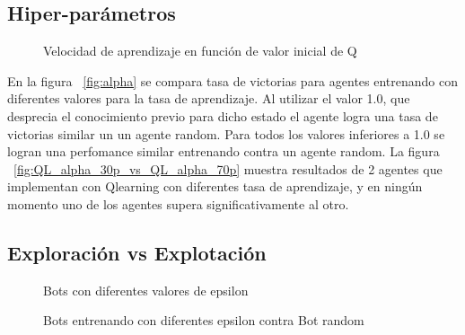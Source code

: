 
\subsection{Hiper-parámetros}

\begin{figure}[H]
\begin{center}
\caption{Velocidad de aprendizaje en función de valor inicial de Q}
\label{fig:qinit}
\end{center}
\end{figure}


En la figura ~\ref{fig:alpha} se compara tasa de victorias para agentes entrenando con diferentes valores para la tasa de aprendizaje. Al utilizar el valor 1.0, que desprecia el conocimiento previo para dicho estado el agente logra una tasa de victorias similar un un agente random. Para todos los valores inferiores a 1.0 se logran una perfomance similar entrenando contra un agente random. La figura ~\ref{fig:QL_alpha_30p_vs_QL_alpha_70p} muestra resultados de 2 agentes que implementan con Qlearning con diferentes tasa de aprendizaje, y en ningún momento uno de los agentes supera significativamente al otro. 
 
\begin{figure}[H]
\begin{center}
\caption{}
\label{fig:alphag}
\end{center}
\end{figure}


\subsection{Exploración vs Explotación}

\begin{figure}[H]
\begin{center}
\caption{Bots con diferentes valores de epsilon}
\label{fig:epsilon}
\end{center}
\end{figure}


\begin{figure}[H]
\begin{center}
\caption{Bots entrenando con diferentes epsilon contra Bot random}
\label{fig:epsilon2}
\end{center}
\end{figure}
